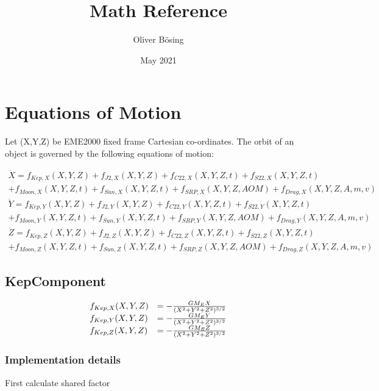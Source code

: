 \documentclass{article}
\title{Math Reference}
\author{Oliver Bösing}
\date{May 2021}
\begin{document}
\maketitle

\section{Equations of Motion}

Let (X,Y,Z) be EME2000 fixed frame Cartesian co-ordinates. The orbit of an object is governed by the following equations of motion:

\begin{equation}
\begin{array}{ll}
     \ddot{X} = f_{Kep,X}(X,Y,Z)+f_{J2,X}(X,Y,Z)+f_{C22,X}(X,Y,Z,t)+f_{S22,X}(X,Y,Z,t)\\
    +f_{Moon,X}(X,Y,Z,t)+f_{Sun,X}(X,Y,Z,t)+f_{SRP,X}(X,Y,Z,AOM)+f_{Drag,X}(X,Y,Z,A,m,v) \\
    \ddot{Y} = f_{Kep,Y}(X,Y,Z)+f_{J2,Y}(X,Y,Z)+f_{C22,Y}(X,Y,Z,t)+f_{S22,Y}(X,Y,Z,t)\\
    +f_{Moon,Y}(X,Y,Z,t)+f_{Sun,Y}(X,Y,Z,t)+f_{SRP,Y}(X,Y,Z,AOM)+f_{Drag,Y}(X,Y,Z,A,m,v) \\
    \ddot{Z} = f_{Kep,Z}(X,Y,Z)+f_{J2,Z}(X,Y,Z)+f_{C22,Z}(X,Y,Z,t)+f_{S22,Z}(X,Y,Z,t)\\
    +f_{Moon,Z}(X,Y,Z,t)+f_{Sun,Z}(X,Y,Z,t)+f_{SRP,Z}(X,Y,Z,AOM)+f_{Drag,Z}(X,Y,Z,A,m,v)
\end{array}
\end{equation}

\subsection{KepComponent}

\begin{equation}
\begin{array}{ll}
f_{Kep,X}(X,Y,Z) &= -{GM_E X\over (X^2+Y^2+Z^2)^{3/2}}\\
f_{Kep,Y}(X,Y,Z) &= -{GM_E Y\over (X^2+Y^2+Z^2)^{3/2}}\\
f_{Kep,Z}(X,Y,Z) &= -{GM_E Z\over (X^2+Y^2+Z^2)^{3/2}}
\end{array}
\end{equation}

\subsubsection{Implementation details}

First calculate shared factor
\end{document}
